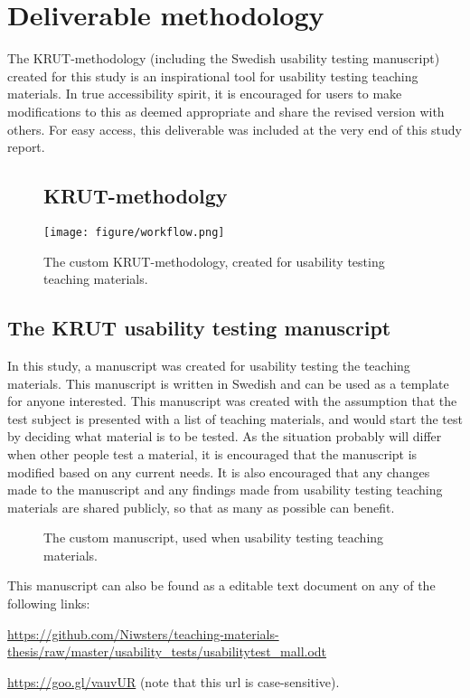 \chapter{Deliverable methodology}
The KRUT-methodology (including the Swedish usability testing manuscript) created for this study is an inspirational tool for usability testing teaching materials. In true accessibility spirit, it is encouraged for users to make modifications to this as deemed appropriate and share the revised version with others. For easy access, this deliverable was included at the very end of this study report. 

\mbox{}
\begin{sidewaysfigure}
\section{KRUT-methodolgy}
\texttt{[image: figure/workflow.png]}
\vspace*{2cm}
\caption{The custom KRUT-methodology, created for usability testing teaching materials.}
\label{app:krut}
\end{sidewaysfigure}

\newpage
\section{The KRUT usability testing manuscript}
In this study, a manuscript was created for usability testing the teaching materials. This manuscript is written in Swedish and can be used as a template for anyone interested. This manuscript was created with the assumption that the test subject is presented with a list of teaching materials, and would start the test by deciding what material is to be tested. As the situation probably will differ when other people test a material, it is encouraged that the manuscript is modified based on any current needs. It is also encouraged that any changes made to the manuscript and any findings made from usability testing teaching materials are shared publicly, so that as many as possible can benefit.

\begin{figure}[h]
\caption{The custom manuscript, used when usability testing teaching materials.}
\label{app:script}
\end{figure}

This manuscript can also be found as a editable text document on any of the following links:

\url{https://github.com/Niwsters/teaching-materials-thesis/raw/master/usability_tests/usabilitytest_mall.odt}

\url{https://goo.gl/vauvUR} (note that this url is case-sensitive).
